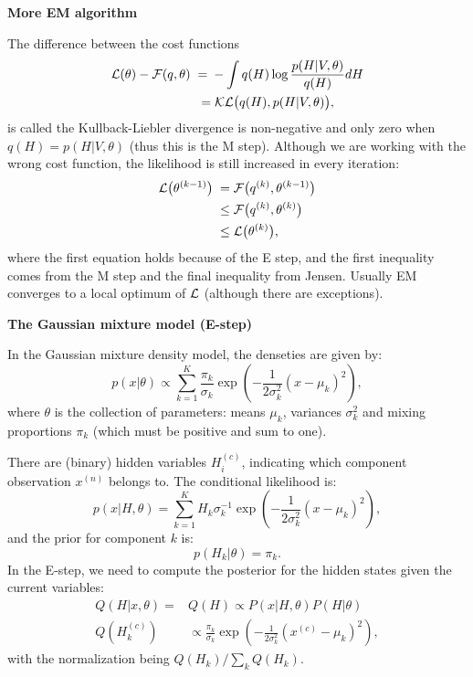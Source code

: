 \documentclass{slides}
\newcommand{\heading}[1]{\begin{center}\large\bf #1\end{center}}
\begin{document}
\begin{slide}
\heading{More EM algorithm}

The difference between the cost functions
%
\begin{equation}
\begin{split}
{\cal L}(\theta)-{\cal F}(q,\theta)\;=\;&-\int
q(H)\log\frac{p(H|V,\theta)}{q(H)}dH\\
=&\; {\cal KL}\big(q(H),p(H|V,\theta)\big),
\end{split}
\end{equation}
%
is called the Kullback-Liebler divergence is non-negative and only zero when
$q(H)=p(H|V,\theta)$ (thus this is the M step). Although we are working with
the wrong cost function, the likelihood is still increased in every iteration:
%
\begin{equation}
\begin{split}
{\cal L}\big(\theta^{(k-1)}\big)\;=&\;{\cal F}\big(q^{(k)},\theta^{(k-1)}\big)\\
\leq&\;{\cal F}\big(q^{(k)},\theta^{(k)}\big)\\
\leq&\;{\cal L}\big(\theta^{(k)}\big),
\end{split}
\end{equation}
where the first equation holds because of the E step, and the first inequality
comes from the M step and the final inequality from Jensen. Usually EM
converges to a local optimum of ${\cal L}$ (although there are exceptions).

\end{slide}

\begin{slide}
\heading{The Gaussian mixture model (E-step)}

In the Gaussian mixture density model, the denseties are given by:
\[
p(x|\theta) \propto \sum_{k=1}^K \frac{\pi_k}{\sigma_k}\exp(-\frac{1}{2\sigma_k^2}(x-\mu_k)^2),
\]
where $\theta$ is the collection of parameters: means $\mu_k$,
variances $\sigma_k^2$ and mixing proportions $\pi_k$ (which must be
positive and sum to one).

There are (binary) hidden variables $H_i^{(c)}$, indicating which
component observation $x^{(n)}$ belongs to. The conditional likelihood is:
\[
p(x|H,\theta) = \sum_{k=1}^KH_k\sigma_k^{-1}\exp(-\frac{1}{2\sigma_k^2}(x-\mu_k)^2),
\]
and the prior for component $k$ is:
\[
p(H_k|\theta)=\pi_k.
\]
In the E-step, we need to compute the posterior for the hidden states
given the current variables:
\[
\begin{split}
Q(H|x,\theta)=&Q(H)\propto P(x|H,\theta)P(H|\theta)\\
Q(H_k^{(c)})&\propto \frac{\pi_k}{\sigma_k}\exp(-\frac{1}{2\sigma_k^2}(x^{(c)}-\mu_k)^2),
\end{split}
\]
with the normalization being $Q(H_k)/\sum_kQ(H_k)$.

\end{slide}
\end{document}
